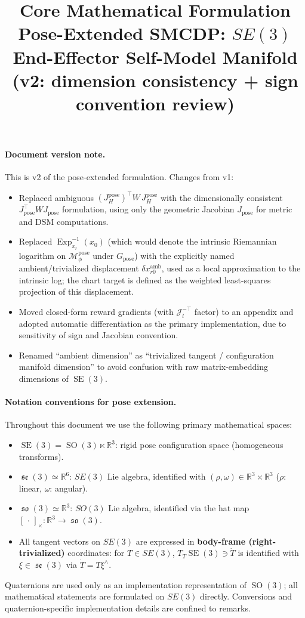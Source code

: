 \documentclass[11pt,a4paper]{article}
\title{Core Mathematical Formulation\\
\large Pose-Extended SMCDP: $SE(3)$ End-Effector Self-Model Manifold\\
\normalsize (v2: dimension consistency + sign convention review)}
\author{}
\date{}
\DeclareMathOperator{\Exp}{Exp}
\DeclareMathOperator{\SE}{SE}
\DeclareMathOperator{\SO}{SO}
\DeclareMathOperator{\so}{\mathfrak{so}}
\DeclareMathOperator{\se}{\mathfrak{se}}
\newcommand{\R}{\mathbb{R}}
\newcommand{\Mpose}{\mathcal{M}_\phi^{\text{pose}}}
\newcommand{\Jpose}{J_{\text{pose}}}
\begin{document}
\maketitle

\paragraph{Document version note.} This is v2 of the pose-extended formulation. Changes from v1:
\begin{itemize}[noitemsep]
    \item Replaced ambiguous $(J_H^{\text{pose}})^\top W \, J_H^{\text{pose}}$ with the dimensionally consistent $\Jpose^\top W \Jpose$ formulation, using only the geometric Jacobian $\Jpose$ for metric and DSM computations.
    \item Replaced $\Exp^{-1}_{x_r}(x_0)$ (which would denote the intrinsic Riemannian logarithm on $\Mpose$ under $G_{\text{pose}}$) with the explicitly named ambient/trivialized displacement $\delta x^{\text{amb}}_{r0}$, used as a local approximation to the intrinsic log; the chart target is defined as the weighted least-squares projection of this displacement.
    \item Moved closed-form reward gradients (with $\mathcal{J}_l^{-\top}$ factor) to an appendix and adopted automatic differentiation as the primary implementation, due to sensitivity of sign and Jacobian convention.
    \item Renamed ``ambient dimension'' as ``trivialized tangent / configuration manifold dimension'' to avoid confusion with raw matrix-embedding dimensions of $\SE(3)$.
\end{itemize}

\paragraph{Notation conventions for pose extension.} Throughout this document we use the following primary mathematical spaces:
\begin{itemize}[noitemsep]
    \item $\SE(3) = \SO(3) \ltimes \R^3$: rigid pose configuration space (homogeneous transforms).
    \item $\se(3) \simeq \R^6$: $SE(3)$ Lie algebra, identified with $(\rho, \omega) \in \R^3 \times \R^3$ ($\rho$: linear, $\omega$: angular).
    \item $\so(3) \simeq \R^3$: $SO(3)$ Lie algebra, identified via the hat map $[\,\cdot\,]_\times: \R^3 \to \so(3)$.
    \item All tangent vectors on $SE(3)$ are expressed in \textbf{body-frame (right-trivialized)} coordinates: for $T \in SE(3)$, $T_T \SE(3) \ni \dot T$ is identified with $\xi \in \se(3)$ via $\dot T = T \xi^\wedge$.
\end{itemize}
Quaternions are used only as an implementation representation of $\SO(3)$; all mathematical statements are formulated on $SE(3)$ directly. Conversions and quaternion-specific implementation details are confined to remarks.
\end{document}
